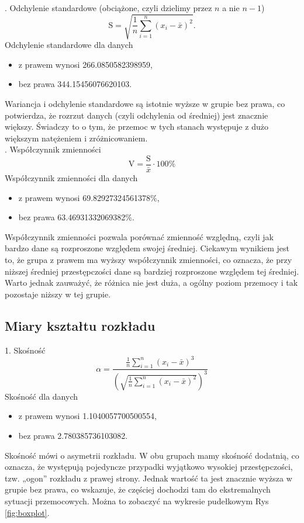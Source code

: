 \documentclass[a4paper,12pt]{article}
\begin{document}
	. Odchylenie standardowe (obciążone, czyli dzielimy przez $n$ a nie $n-1$)
	\begin{equation}
		\text{S} = \sqrt{\frac{1}{n} \sum_{i=1}^{n} (x_i - \bar x)^2}.
	\end{equation}
	Odchylenie standardowe dla danych
	\begin{itemize}[itemsep=5pt,parsep=0pt]
		\item z prawem wynosi 266.0850582398959,
		\item bez prawa 344.15456076620103.
	\end{itemize}
	Wariancja i odchylenie standardowe są istotnie wyższe w grupie bez prawa, co potwierdza, że rozrzut danych (czyli odchylenia od średniej) jest znacznie większy. Świadczy to o tym, że przemoc w tych stanach występuje z dużo większym natężeniem i zróżnicowaniem. \\
	
	. Współczynnik zmienności
	\begin{equation}
		\text{V} = \frac{\text{S}}{\bar x} \cdot 100\%
	\end{equation}
	Współczynnik zmienności dla danych
	\begin{itemize}[itemsep=5pt,parsep=0pt]
		\item z prawem wynosi 69.82927324561378$\%$,
		\item bez prawa 63.46931332069382$\%$.
	\end{itemize}
	Współczynnik zmienności pozwala porównać zmienność względną, czyli jak bardzo dane są rozproszone względem swojej średniej. Ciekawym wynikiem jest to, że grupa z prawem ma wyższy współczynnik zmienności, co oznacza, że przy niższej średniej przestępczości dane są bardziej rozproszone względem tej średniej. Warto jednak zauważyć, że różnica nie jest duża, a ogólny poziom przemocy i tak pozostaje niższy w tej grupie. \\
	
	\subsection{Miary kształtu rozkładu}
	1. Skośność
	\begin{equation}
		\alpha = \frac{\frac{1}{n} \sum_{i=1}^{n} (x_i - \bar x)^3}{\left(\sqrt{\frac{1}{n} \sum_{i=1}^{n} (x_i - \bar x)^2}\right)^3}
	\end{equation}
	Skośność dla danych
	\begin{itemize}[itemsep=5pt,parsep=0pt]
		\item z prawem wynosi 1.1040057700500554,
		\item bez prawa 2.780385736103082.
	\end{itemize}
	Skośność mówi o asymetrii rozkładu. W obu grupach mamy skośność dodatnią, co oznacza, że występują pojedyncze przypadki wyjątkowo wysokiej przestępczości, tzw. „ogon” rozkładu z prawej strony. Jednak wartość ta jest znacznie wyższa w grupie bez prawa, co wskazuje, że częściej dochodzi tam do ekstremalnych sytuacji przemocowych. Można to zobaczyć na wykresie pudełkowym Rys \ref{fig:boxplot}. \\
	
\end{document}
